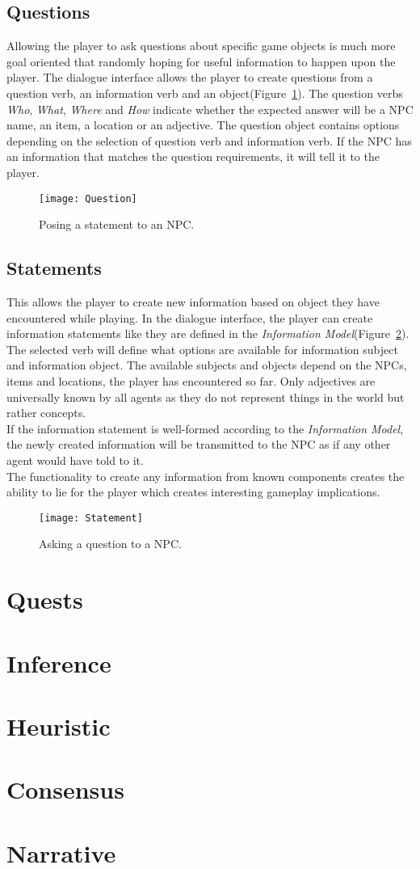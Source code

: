 \subsection{Questions}
Allowing the player to ask questions about specific game objects is much more goal oriented that randomly hoping for useful information to happen upon the player. The dialogue interface allows the player to create questions from a question verb, an information verb and an object(Figure~\ref{fig:question}). The question verbs \textit{Who}, \textit{What}, \textit{Where} and \textit{How} indicate whether the expected answer will be a NPC name, an item, a location or an adjective. The question object contains options depending on the selection of question verb and information verb. If the NPC has an information that matches the question requirements, it will tell it to the player.
\begin{figure}
	\centering
	\texttt{[image: Question]}
	\caption{Posing a statement to an NPC.}
	\label{fig:question}
\end{figure}
\subsection{Statements}
This allows the player to create new information based on object they have encountered while playing. In the dialogue interface, the player can create information statements like they are defined in the \textit{Information Model}(Figure~\ref{fig:statement}). The selected verb will define what options are available for information subject and information object. The available subjects and objects depend on the NPCs, items and locations, the player has encountered so far. Only adjectives are universally known by all agents as they do not represent things in the world but rather concepts.\\
If the information statement is well-formed according to the \textit{Information Model}, the newly created information will be transmitted to the NPC as if any other agent would have told to it.\\
The functionality to create any information from known components creates the ability to lie for the player which creates interesting gameplay implications.
\begin{figure}
	\centering
	\texttt{[image: Statement]}
	\caption{Asking a question to a NPC.}
	\label{fig:statement}
\end{figure}
\section{Quests}
\section{Inference}
\section{Heuristic}
\section{Consensus}
\section{Narrative}
